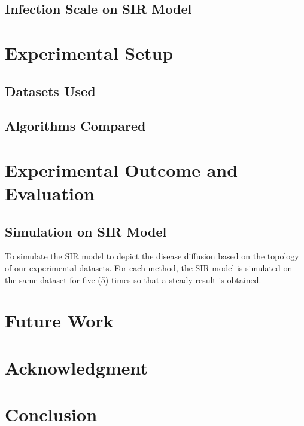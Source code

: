 \documentclass[sigconf]{acmart}
\begin{document}

\subsection{Infection Scale on SIR Model}


\section{Experimental Setup}

\subsection{Datasets Used}

\subsection{Algorithms Compared}


\section{Experimental Outcome and Evaluation}

\subsection{Simulation on SIR Model}
To simulate the SIR model to depict the disease diffusion based on the topology of our experimental datasets. For each method, the SIR model is simulated on the same dataset for five (5) times so that a steady result is obtained. 

\section{Future Work}

\section{Acknowledgment}


\section{Conclusion}





\end{document}
